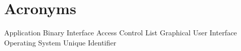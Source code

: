 \chapter*{Acronyms} %
\label{chap:acronyms}
\footnotesize
\begin{acronym}[ABCDE]
   {Application Binary Interface}
   {Access Control List}
   {Graphical User Interface}
    {Operating System}
   {Unique Identifier}
\end{acronym}
\normalsize
